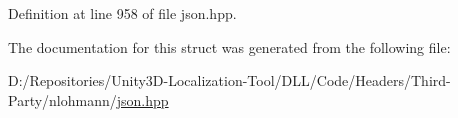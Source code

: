 Definition at line 958 of file json.\+hpp.



The documentation for this struct was generated from the following file\+:\begin{DoxyCompactItemize}
\item 
D\+:/\+Repositories/\+Unity3\+D-\/\+Localization-\/\+Tool/\+D\+L\+L/\+Code/\+Headers/\+Third-\/\+Party/nlohmann/\mbox{\hyperlink{json_8hpp}{json.\+hpp}}\end{DoxyCompactItemize}
